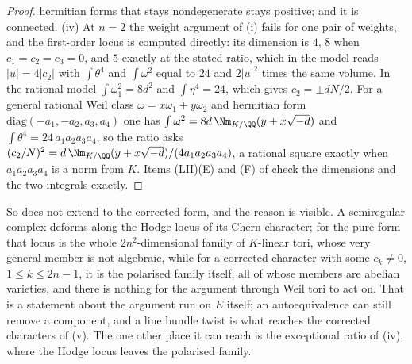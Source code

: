 \begin{proof}
hermitian forms that stays nondegenerate stays positive; and it is
connected. (iv) At $n=2$ the weight argument of
(i) fails for one pair of weights, and the
first-order locus is computed directly: its dimension is $4$, $8$ when
$c_{1}=c_{2}=c_{3}=0$, and $5$ exactly at the stated ratio, which in the model
reads $|u|=4|c_{2}|$ with $\int\theta^{4}$ and $\int\omega^{2}$ equal to $24$
and $2|u|^{2}$ times the same volume. In the rational model $\int\omega_{1}^{2}=8d^{2}$
and $\int\eta^{4}=24$, which gives $c_{2}=\pm dN/2$. For a general rational
Weil class $\omega=x\omega_{1}+y\omega_{2}$ and hermitian form
$\mathrm{diag}(-a_{1},-a_{2},a_{3},a_{4})$ one has
$\int\omega^{2}=8d\,\Nm_{K/\QQ}(y+x\sqrt{-d})$ and
$\int\theta^{4}=24\,a_{1}a_{2}a_{3}a_{4}$, so the ratio asks
$(c_{2}/N)^{2}=d\,\Nm_{K/\QQ}(y+x\sqrt{-d})/(4a_{1}a_{2}a_{3}a_{4})$, a rational
square exactly when $a_{1}a_{2}a_{3}a_{4}$ is a norm from $K$. Items (LII)(E)
and (F) of  check the dimensions and the two integrals
exactly.
\end{proof}

So  does not extend to the corrected form, and the reason is
visible. A semiregular complex deforms along the Hodge locus of its Chern
character; for the pure form that locus is the whole $2n^{2}$-dimensional
family of $K$-linear tori, whose very general member is not algebraic, while
for a corrected character with some $c_{k}\ne0$, $1\le k\le2n-1$, it is the
polarised family itself, all of whose members are abelian varieties, and
there is nothing for the argument through Weil tori to act on. That is a
statement about the argument run on $E$ itself; an autoequivalence can still
remove a component, and a line bundle twist is what reaches the corrected
characters of (v). The one other place it can reach is
the exceptional ratio of (iv), where the Hodge locus leaves the polarised
family.

